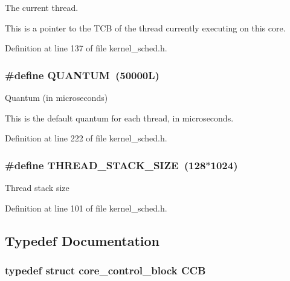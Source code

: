 The current thread. 

This is a pointer to the T\-C\-B of the thread currently executing on this core. 

Definition at line 137 of file kernel\-\_\-sched.\-h.

\hypertarget{group__scheduler_gabc4f0f9abea1b5443308e4ea84b52b21}{
\subsubsection[{Q\-U\-A\-N\-T\-U\-M}]{\setlength{\rightskip}{0pt plus 5cm}\#define Q\-U\-A\-N\-T\-U\-M~(50000\-L)}}\label{group__scheduler_gabc4f0f9abea1b5443308e4ea84b52b21}


Quantum (in microseconds) 

This is the default quantum for each thread, in microseconds. 

Definition at line 222 of file kernel\-\_\-sched.\-h.

\hypertarget{group__scheduler_ga90b7a8cb7bc3fdbd98014a3e15ee6e9a}{
\subsubsection[{T\-H\-R\-E\-A\-D\-\_\-\-S\-T\-A\-C\-K\-\_\-\-S\-I\-Z\-E}]{\setlength{\rightskip}{0pt plus 5cm}\#define T\-H\-R\-E\-A\-D\-\_\-\-S\-T\-A\-C\-K\-\_\-\-S\-I\-Z\-E~(128$\ast$1024)}}\label{group__scheduler_ga90b7a8cb7bc3fdbd98014a3e15ee6e9a}
Thread stack size 

Definition at line 101 of file kernel\-\_\-sched.\-h.



\subsection{Typedef Documentation}
\hypertarget{group__scheduler_ga7485b31e0dd9fd723bc2d75fba5206a0}{
\subsubsection[{C\-C\-B}]{\setlength{\rightskip}{0pt plus 5cm}typedef struct {\bf core\-\_\-control\-\_\-block}  {\bf C\-C\-B}}}\label{group__scheduler_ga7485b31e0dd9fd723bc2d75fba5206a0}



